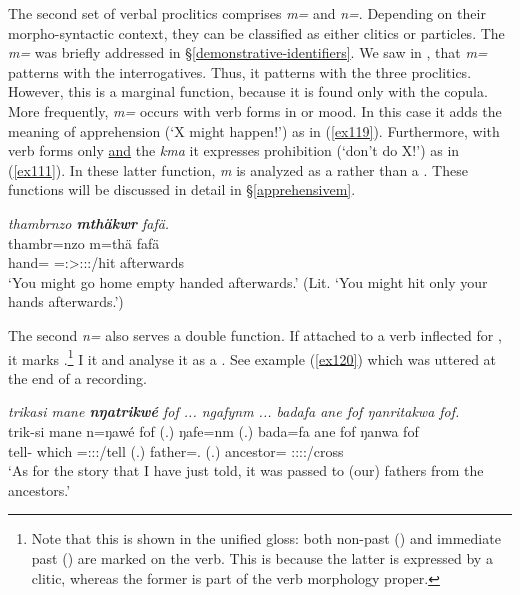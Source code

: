 The second set of verbal proclitics comprises \emph{m=} and \emph{n=}. Depending on their morpho-syntactic context, they can be classified as either clitics or particles. The \emph{m=}  was briefly addressed in \S{}\ref{demonstrative-identifiers}. We saw in , that \emph{m=} patterns with the interrogatives. Thus, it patterns with the three  proclitics. However, this is a marginal function, because it is found only with the copula. More frequently, \emph{m=} occurs with verb forms in  or  mood. In this case it adds the meaning of apprehension (`X might happen!') as in (\ref{ex119}). Furthermore, with  verb forms only \uline{and} the   \emph{kma} it expresses prohibition (`don't do X!') as in (\ref{ex111}). In these latter function, \emph{m} is analyzed as a  rather than a . These functions will be discussed in detail in \S{}\ref{apprehensivem}.

\begin{exe}
	\ex \emph{thambrnzo \textbf{mthäkwr} fafä.}\\
	\gll thambr=nzo m=thä fafä\\
	hand=\Only{} \Appr{}=\Ssg:\Sbj>\Stpl:\Obj:\Imp:\Pfv/hit afterwards\\
	\trans `You might go home empty handed afterwards.' (Lit. `You might hit only your hands afterwards.') 
	\label{ex119}
\end{exe}

The second  \emph{n=} also serves a double function. If attached to a verb inflected for , it marks .\footnote{Note that this is shown in the unified gloss: both non-past (\Nonpast) and immediate past (\Immpst) are marked on the verb. This is because the latter is expressed by a clitic, whereas the former is part of the verb morphology proper.} I  it \Immpst{} and analyse it as a . See example (\ref{ex120}) which was uttered at the end of a recording.

\begin{exe}
	\ex \emph{trikasi mane \textbf{nŋatrikwé} fof ... ngafynm ... badafa ane fof ŋanritakwa fof.}\\
	\gll trik-si mane n=ŋawé fof (.) ŋafe=nm (.) bada=fa ane fof ŋanwa fof\\
	tell-\Nmlz{} which \Immpst=\Fsg:\Sbj:\Nonpast:\Ipfv/tell \Emph{} (.) father=\Dat{}.\Nsg{} (.) ancestor=\Abl{} \Dem{} \Emph{} \Stsg:\Sbj:\Pst:\Ipfv:\Venit/cross \Emph{}\\
	\trans `As for the story that I have just told, it was passed to (our) fathers from the ancestors.' 
	\label{ex120}
\end{exe}

